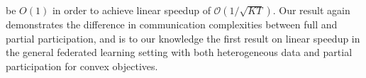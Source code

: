 be $O(1)$ in order to achieve linear speedup of $\mathcal{O}(1/\sqrt{KT})$.
Our result again demonstrates the difference in communication complexities
between full and partial participation, and is to our knowledge the
first result on linear speedup in the general federated learning setting
with both heterogeneous data and partial participation for convex objectives.
\begin{comment}
\textbf{Learning rate. }The learning rate now depends on the final
horizon $T$ of the convergence statement, whereas in the strongly
convex case the learning rate decays as $\mathcal{O}(1/t)$. Such
a requirement $\alpha_{t}=\mathcal{O}(\sqrt{N/T})$ also presents
in \cite{haddadpour2019convergence,yu2019parallel} on non-convex
problems with $\mathcal{O}(1/\sqrt{NT})$ linear speedup convergence results. 
\end{comment}